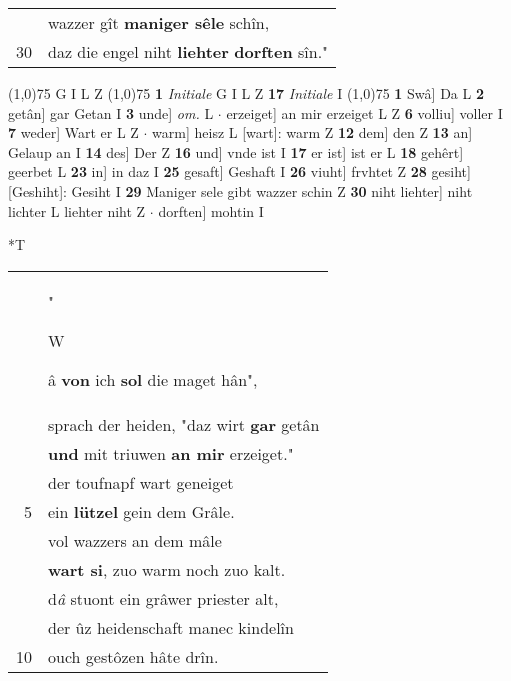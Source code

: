 \documentclass[8pt,a4paper,notitlepage]{article}
\begin{document}
\begin{table}[ht]
\begin{minipage}[t]{0.5\linewidth}
\begin{tabular}{rl}
 & wazzer gît \textbf{maniger sêle} schîn,\\ 
30 & daz die engel niht \textbf{liehter} \textbf{dorften} sîn."\\ 
\end{tabular}
\scriptsize
\line(1,0){75} \newline
G I L Z \newline
\line(1,0){75} \newline
\textbf{1} \textit{Initiale} G I L Z  \textbf{17} \textit{Initiale} I  \newline
\line(1,0){75} \newline
\textbf{1} Swâ] Da L \textbf{2} getân] gar Getan I \textbf{3} unde] \textit{om.} L  $\cdot$ erzeiget] an mir erzeiget L Z \textbf{6} volliu] voller I \textbf{7} weder] Wart er L Z  $\cdot$ warm] heisz L [wart]: warm Z \textbf{12} dem] den Z \textbf{13} an] Gelaup an I \textbf{14} des] Der Z \textbf{16} und] vnde ist I \textbf{17} er ist] ist er L \textbf{18} gehêrt] geerbet L \textbf{23} in] in daz I \textbf{25} gesaft] Geshaft I \textbf{26} viuht] frvhtet Z \textbf{28} gesiht] [Geshiht]: Gesiht I \textbf{29} Maniger sele gibt wazzer schin Z \textbf{30} niht liehter] niht lichter L liehter niht Z  $\cdot$ dorften] mohtin I \newline
\end{minipage}
\hspace{0.5cm}
\begin{minipage}[t]{0.5\linewidth}
\small
\begin{center}*T
\end{center}
\begin{tabular}{rl}
 & "\begin{large}W\end{large}â \textbf{von} ich \textbf{sol} die maget hân",\\ 
 & sprach der heiden, "daz wirt \textbf{gar} getân\\ 
 & \textbf{und} mit triuwen \textbf{an mir} erzeiget."\\ 
 & der toufnapf wart geneiget\\ 
5 & ein \textbf{lützel} gein dem Grâle.\\ 
 & vol wazzers an dem mâle\\ 
 & \textbf{wart si}, zuo warm noch zuo kalt.\\ 
 & d\textit{â} stuont ein grâwer priester alt,\\ 
 & der ûz heidenschaft manec kindelîn\\ 
10 & ouch gestôzen hâte drîn.\\ 

\end{tabular}
\end{minipage}
\end{table}
\end{document}
